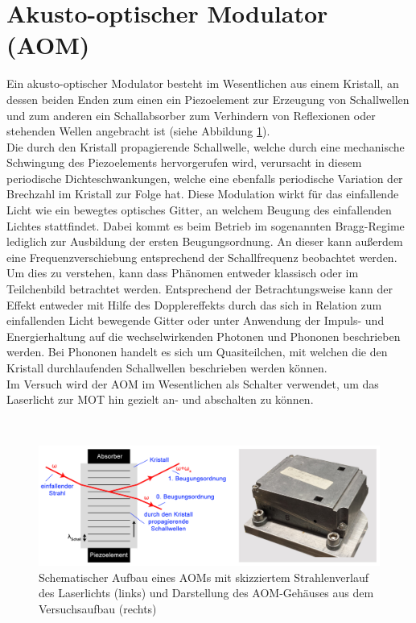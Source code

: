 \documentclass[
class=book,
accentcolor=1b,
custommargins=geometry,
fontsize=11pt,
thesis={type=Versuchsanleitung},
ruledheaders=all,
headline=false,
instbox=false,
marginpar=false,
title=small,
ignore-missing-data=true,
twoside=false,
logofile=apqdesign/tuda_logo.pdf,
pdfa=false %
]{apqpub}
\newtheorem{frage}[satz]{Frage}
\newcommand{\gqq}[1]{\glqq{}#1\grqq{}}
\begin{document}
\section{Akusto-optischer Modulator (AOM)}

Ein akusto-optischer Modulator besteht im Wesentlichen aus einem Kristall, an dessen beiden Enden zum einen ein Piezoelement zur Erzeugung von Schallwellen und zum anderen ein Schallabsorber zum Verhindern von Reflexionen oder stehenden Wellen angebracht ist (siehe Abbildung \ref{fig:AOM}).\\
Die durch den Kristall propagierende Schallwelle, welche durch eine mechanische Schwingung des Piezoelements hervorgerufen wird, verursacht in diesem periodische Dichteschwankungen, welche eine ebenfalls periodische Variation der Brechzahl im Kristall zur Folge hat. \cite{OLL}
Diese Modulation wirkt für das einfallende Licht wie ein bewegtes optisches Gitter, an welchem Beugung des einfallenden Lichtes stattfindet. 
Dabei kommt es beim Betrieb im sogenannten Bragg-Regime lediglich zur Ausbildung der ersten Beugungsordnung. An dieser kann außerdem eine Frequenzverschiebung entsprechend der Schallfrequenz beobachtet werden. 
Um dies zu verstehen, kann dass Phänomen entweder klassisch oder im Teilchenbild betrachtet werden. Entsprechend der Betrachtungsweise kann der Effekt entweder mit Hilfe des Dopplereffekts durch das sich in Relation zum einfallenden Licht \gqq{bewegende Gitter} oder unter Anwendung der Impuls- und Energierhaltung auf die wechselwirkenden Photonen und Phononen beschrieben werden.
Bei Phononen handelt es sich um Quasiteilchen, mit welchen die den Kristall durchlaufenden Schallwellen beschrieben werden können. \cite{OFI}\\
Im Versuch wird der AOM im Wesentlichen als Schalter verwendet, um das Laserlicht zur MOT hin gezielt an- und abschalten zu können.
\vspace{7pt}

\\	
	\begin{figure}[htb!]
		\centering
		\includegraphics[width=\textwidth]{graphics/AOM2.pdf}
		\caption{Schematischer Aufbau eines AOMs mit skizziertem Strahlenverlauf des Laserlichts (links)
			und Darstellung des AOM-Gehäuses aus dem Versuchsaufbau (rechts)}
		\label{fig:AOM}
	\end{figure}
	
\end{document}
